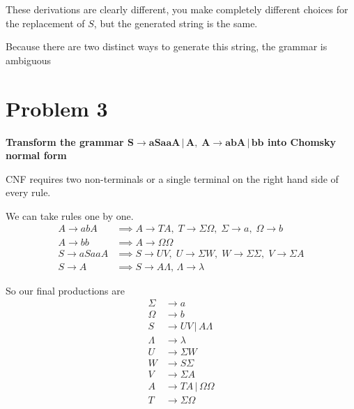 \documentclass{report}
\begin{document}
These derivations are clearly different, you make completely different choices for the replacement of $S$, but the generated string is the same.

Because there are two distinct ways to generate this string, the grammar is ambiguous


\section*{Problem 3}

\textbf{Transform the grammar $\mathbf{S \rightarrow aSaaA \, | \, A, \; A \rightarrow abA \, | \, bb}$ into Chomsky normal form}

CNF requires two non-terminals or a single terminal on the right hand side of every rule. 

We can take rules one by one.
\begin{align*}
        A \rightarrow abA &\implies A \rightarrow TA, \; T \rightarrow \Sigma \Omega, \; \Sigma \rightarrow a, \; \Omega \rightarrow b \\
        A \rightarrow bb &\implies A \rightarrow \Omega \Omega \\
        S \rightarrow aSaaA &\implies S \rightarrow UV, \; U \rightarrow \Sigma W, \; W \rightarrow \Sigma \Sigma, \; V \rightarrow \Sigma A \\
        S \rightarrow A &\implies S \rightarrow A\Lambda, \, \Lambda \rightarrow \lambda
\end{align*}

So our final productions are 
\begin{align*}
        \Sigma &\rightarrow a \\
        \Omega &\rightarrow b \\
        S &\rightarrow UV \, | \, A\Lambda\\
        \Lambda &\rightarrow \lambda\\
        U &\rightarrow \Sigma W \\ 
        W &\rightarrow S \Sigma \\
        V &\rightarrow \Sigma A \\
        A &\rightarrow TA \, | \, \Omega \Omega\\
        T &\rightarrow \Sigma \Omega
\end{align*}
\end{document}
